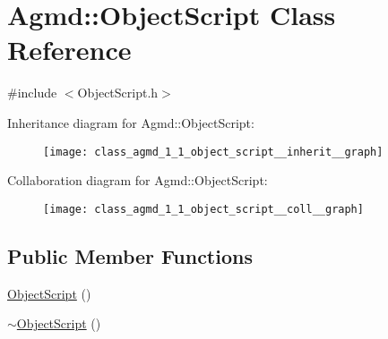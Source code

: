 \hypertarget{class_agmd_1_1_object_script}{\section{Agmd\+:\+:Object\+Script Class Reference}
\label{class_agmd_1_1_object_script}
}


{\ttfamily \#include $<$Object\+Script.\+h$>$}



Inheritance diagram for Agmd\+:\+:Object\+Script\+:\nopagebreak
\begin{figure}[H]
\begin{center}
\leavevmode
\texttt{[image: class\_agmd\_1\_1\_object\_script\_\_inherit\_\_graph]}
\end{center}
\end{figure}


Collaboration diagram for Agmd\+:\+:Object\+Script\+:\nopagebreak
\begin{figure}[H]
\begin{center}
\leavevmode
\texttt{[image: class\_agmd\_1\_1\_object\_script\_\_coll\_\_graph]}
\end{center}
\end{figure}
\subsection*{Public Member Functions}
\begin{DoxyCompactItemize}
\item 
\hyperlink{class_agmd_1_1_object_script_a556a29183ffe896b02d71622702e0256}{Object\+Script} ()
\item 
\hyperlink{class_agmd_1_1_object_script_a702ec8961d46c5346443fc7bdbe26d94}{$\sim$\+Object\+Script} ()
\end{DoxyCompactItemize}


